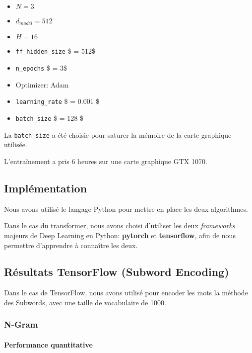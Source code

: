\begin{itemize}
\tightlist
\item
  \(N = 3\)
\item
  \(d_{model} = 512\)
\item
  \(H = 16\)
\item
  \texttt{ff\_hidden\_size} \$ = 512\$
\item
  \texttt{n\_epochs} \$ = 3\$
\item
  Optimizer: Adam
\item
  \texttt{learning\_rate} \$ = 0.001 \$
\item
  \texttt{batch\_size} \$ = 128 \$
\end{itemize}

La \texttt{batch\_size} a été choisie pour saturer la mémoire de la
carte graphique utilisée.

L'entraînement a pris 6 heures sur une carte graphique GTX 1070.

\hypertarget{impluxe9mentation}{%
\subsection{Implémentation}\label{impluxe9mentation}}

Nous avons utilisé le langage Python pour mettre en place les deux
algorithmes.

Dans le cas du transformer, nous avons choisi d'utiliser les deux
\emph{frameworks} majeurs de Deep Learning en Python: \textbf{pytorch}
et \textbf{tensorflow}, afin de nous permettre d'apprendre à connaître
les deux.

\hypertarget{ruxe9sultats}{%
\subsection{Résultats TensorFlow (Subword Encoding)}\label{ruxe9sultats}}

Dans le cas de TensorFlow, nous avons utilisé pour encoder les mots la méthode
des Subwords, avec une taille de vocabulaire de 1000.

\hypertarget{n-gram}{%
\subsubsection{N-Gram}\label{n-gram}}

\hypertarget{performance-quantitative}{%
\paragraph{Performance quantitative}\label{performance-quantitative}}

